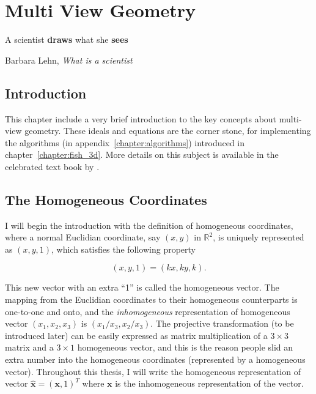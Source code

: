 \documentclass[11pt,twoside]{report}
\begin{document}
\chapter{Multi View Geometry}
\label{chapter:multi_view}

\epigraph{
A scientist \textbf{draws} what she \textbf{sees}
}{Barbara Lehn, \emph{What is a scientist}}

\section{Introduction}

This chapter include a very brief introduction to the key concepts about multi-view geometry. These ideals and equations are the corner stone, for implementing the algorithms (in appendix~\ref{chapter:algorithms}) introduced   in chapter~\ref{chapter:fish_3d}. More details on this subject is available in the celebrated text book by \citeauthor{hartley2003} \cite{hartley2003}.


\section{The Homogeneous Coordinates}


I will begin the introduction with the definition of homogeneous coordinates, where a normal Euclidian coordinate, say $(x, y)$ in $\mathbb{R}^2$, is uniquely represented as $(x, y, 1)$, which satisfies the following property
 
 $$
 (x, y, 1) = (kx, ky, k).
 $$
 
 \noindent This new vector with an extra ``1'' is called the homogeneous vector. The mapping from the Euclidian coordinates to their homogeneous counterparts is one-to-one and onto, and the \emph{inhomogeneous} representation of homogeneous vector $(x_1, x_2, x_3)$ is $(x_1/x_3, x_2/x_3)$. The projective transformation (to be introduced later) can be easily expressed as matrix multiplication of a $3 \times 3$ matrix and a $3 \times 1$ homogeneous vector, and this is the reason people slid an extra number into the homogeneous coordinates (represented by a homogeneous vector). Throughout this thesis, I will write the homogeneous representation of vector $\hat{\mathbf{x}} = (\mathbf{x}, 1)^T$ where $\mathbf{x}$ is the inhomogeneous representation of the vector.
 
\end{document}
